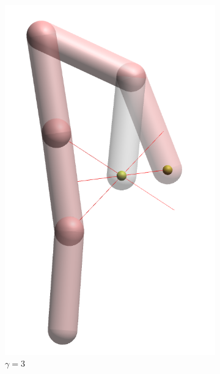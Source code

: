 \begin{figure}
    \centering
    \begin{subfigure}[b]{0.2\textwidth}
        \includegraphics[width=\textwidth]{Figures/simple_distortion_3.png}
        \caption{$\gamma = 3$}
    \end{subfigure}
    ~ %
    \begin{subfigure}[b]{0.2\textwidth}

\end{subfigure}
\end{figure}
